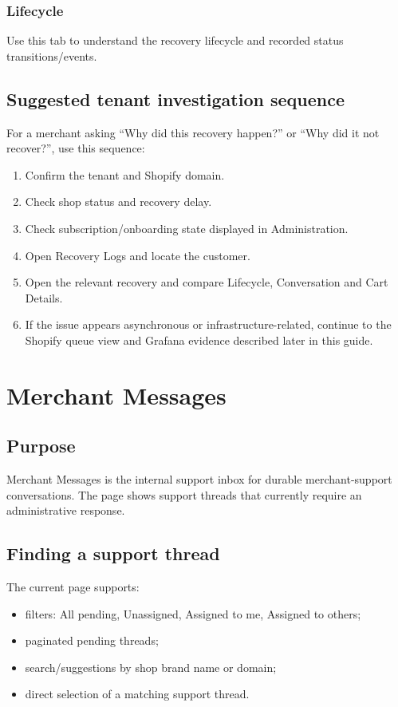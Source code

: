 
\subsection{Lifecycle}
Use this tab to understand the recovery lifecycle and recorded status transitions/events.


\section{Suggested tenant investigation sequence}
For a merchant asking ``Why did this recovery happen?'' or ``Why did it not recover?'', use this sequence:
\begin{enumerate}
  \item Confirm the tenant and Shopify domain.
  \item Check shop status and recovery delay.
  \item Check subscription/onboarding state displayed in Administration.
  \item Open Recovery Logs and locate the customer.
  \item Open the relevant recovery and compare Lifecycle, Conversation and Cart Details.
  \item If the issue appears asynchronous or infrastructure-related, continue to the Shopify queue view and Grafana evidence described later in this guide.
\end{enumerate}

\chapter{Merchant Messages}

\section{Purpose}
Merchant Messages is the internal support inbox for durable merchant-support conversations. The page shows support threads that currently require an administrative response.


\section{Finding a support thread}
The current page supports:
\begin{itemize}
  \item filters: All pending, Unassigned, Assigned to me, Assigned to others;
  \item paginated pending threads;
  \item search/suggestions by shop brand name or domain;
  \item direct selection of a matching support thread.
\end{itemize}

